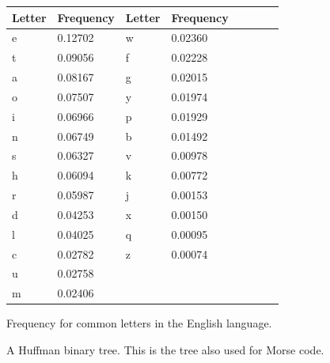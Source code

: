 \documentclass{beamer}
\begin{document}
\begin{frame}
\begin{center}
\begin{figure}[!htbp]
\begin{tabular}{| l | l | l | l | l | l | l | l |}
\hline
Letter & Frequency & Letter & Frequency\\ \hline
e & 0.12702 & w & 0.02360 \\ \hline
t & 0.09056 & f & 0.02228 \\ \hline
a & 0.08167 & g & 0.02015 \\ \hline
o & 0.07507 & y & 0.01974 \\ \hline
i & 0.06966 & p & 0.01929 \\ \hline
n & 0.06749 & b & 0.01492 \\ \hline
s & 0.06327 & v & 0.00978 \\ \hline
h & 0.06094 & k & 0.00772 \\ \hline
r & 0.05987 & j & 0.00153 \\ \hline
d & 0.04253 & x & 0.00150 \\ \hline
l & 0.04025 & q & 0.00095 \\ \hline
c & 0.02782 & z & 0.00074 \\ \hline
u & 0.02758 &   &         \\ \hline
m & 0.02406 &   &         \\ \hline
\end{tabular}
\caption{Frequency for common letters in the English language.}
\end{figure}
\end{center}
\end{frame}

\begin{frame}
\begin{figure}[!htbp]
\begin{center}
\caption{A Huffman binary tree. This is the tree also used for Morse code.}
\end{center}
\end{figure}
\end{frame}
\end{document}
